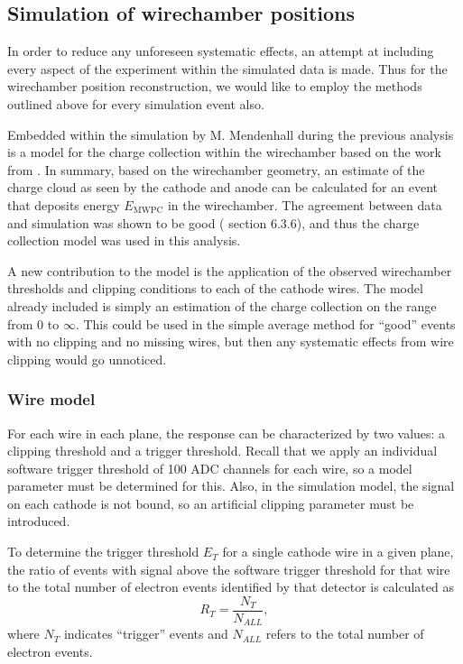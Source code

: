 \subsection{Simulation of wirechamber positions}

In order to reduce any unforeseen systematic effects, an attempt at including
every aspect of the experiment within the simulated data is made. Thus for the wirechamber
position reconstruction, we would like to employ the methods outlined above for every
simulation event also. 

Embedded within the simulation by M. Mendenhall during the previous analysis
is a model for the charge collection within the wirechamber based on the work
from \cite{mathieson1991induced}. In summary, based on the wirechamber geometry, an estimate
of the charge cloud as seen by the cathode and anode can be calculated for an event
that deposits energy $E_{\mathrm{MWPC}}$ in the wirechamber. The agreement between data and simulation was
shown to be good (\cite{mpmThesis} section 6.3.6), and thus the charge collection
model was used in this analysis.

A new contribution to the model is the application of the observed wirechamber thresholds
and clipping conditions to each of the cathode wires. The model already included is simply an estimation of the charge
collection on the range from $0$ to $\infty$. This could be used in the simple average method for ``good'' events
with no clipping and no missing wires, but then any systematic effects from wire clipping would go unnoticed.

\subsubsection{Wire model}

For each wire in each plane, the response can be characterized by two values: a clipping threshold and a trigger threshold.
Recall that we apply an individual software trigger threshold of 100 ADC channels for each wire, so a model parameter must
be determined for this. Also, in the simulation model, the signal on each cathode is not bound, so an artificial
clipping parameter must be introduced.

To determine the trigger threshold $E_T$ for a single cathode wire in a given plane, the ratio of
events with signal above the software trigger threshold for that wire
to the total number of electron events identified by that detector is calculated as
\begin{equation}
  R_{T} = \frac{N_T}{N_{ALL}},
\end{equation}
where $N_T$ indicates ``trigger'' events and $N_{ALL}$ refers to the total number of electron events.

